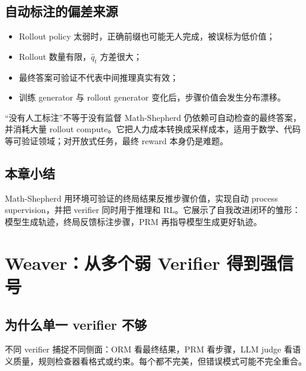 \documentclass[a4paper]{article}
\begin{document}


\subsection{自动标注的偏差来源}

\begin{itemize}
    \item Rollout policy 太弱时，正确前缀也可能无人完成，被误标为低价值；
    \item Rollout 数量有限，$\hat q_t$ 方差很大；
    \item 最终答案可验证不代表中间推理真实有效；
    \item 训练 generator 与 rollout generator 变化后，步骤价值会发生分布漂移。
\end{itemize}

\begin{warningbox}{“没有人工标注”不等于没有监督}
Math-Shepherd 仍依赖可自动检查的最终答案，并消耗大量 rollout compute。它把人力成本转换成采样成本，适用于数学、代码等可验证领域；对开放式任务，最终 reward 本身仍是难题。
\end{warningbox}

\subsection{本章小结}

Math-Shepherd 用环境可验证的终局结果反推步骤价值，实现自动 process supervision，并把 verifier 同时用于推理和 RL。它展示了自我改进闭环的雏形：模型生成轨迹，终局反馈标注步骤，PRM 再指导模型生成更好轨迹。

\section{Weaver：从多个弱 Verifier 得到强信号}

\subsection{为什么单一 verifier 不够}

不同 verifier 捕捉不同侧面：ORM 看最终结果，PRM 看步骤，LLM judge 看语义质量，规则检查器看格式或约束。每个都不完美，但错误模式可能不完全重合。
\end{document}
